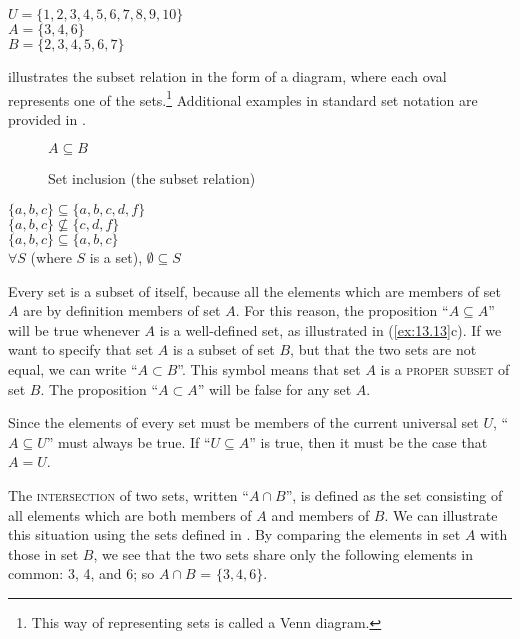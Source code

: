 \ea \label{ex:13.12}
$U = \{1,2,3,4,5,6,7,8,9,10\}$\\
$A = \{3,4,6\}$\\
$B = \{2,3,4,5,6,7\}$
\z


 illustrates the subset relation in the form of a diagram, where each oval represents one of the sets.\footnote{This way of representing sets is called a Venn diagram.} Additional examples in standard set notation are provided in .


\begin{figure}

  $A\subseteq B$\\

\caption{\label{fig:13:1} Set inclusion (the subset relation)}
\end{figure}

\ea \label{ex:13.13}
\ea $\{a,b,c\} \subseteq \{a,b,c,d,f\}$\\
\ex $\{a,b,c\}  \nsubseteq \{c,d,f\}$ \\
\ex $\{a,b,c\}  \subseteq \{a,b,c\}$\\
\ex $\forall S$ (where $S$ is a set), ${∅ \subseteq S}$
                       \z
\z


Every set is a subset of itself, because all the elements which are members of set $A$ are by definition members of set $A$. For this reason, the proposition “$A\subseteq A$” will be true whenever $A$ is a well-defined set, as illustrated in (\ref{ex:13.13}c). If we want to specify that set $A$ is a subset of set $B$, but that the two sets are not equal, we can write “$A\subset B$”. This symbol means that set $A$ is a \textsc{proper subset} of set $B$. The proposition “$A\subset A$” will be false for any set $A$.



Since the elements of every set must be members of the current universal set $U$, “$A\subseteq U$” must always be true. If “$U\subseteq A$” is true, then it must be the case that $A=U$.



The \textsc{intersection} of two sets, written “$A\cap B$”, is defined as the set consisting of all elements which are both members of $A$ and members of $B$. We can illustrate this situation using the sets defined in . By comparing the elements in set $A$ with those in set $B$, we see that the two sets share only the following elements in common: 3, 4, and 6; so $A\cap B$ = $\{3,4,6\}$.


